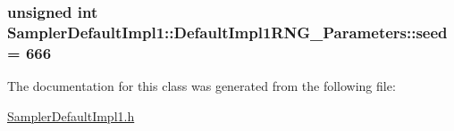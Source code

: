 \subsubsection[{\texorpdfstring{seed}{seed}}]{\setlength{\rightskip}{0pt plus 5cm}unsigned int Sampler\+Default\+Impl1\+::\+Default\+Impl1\+R\+N\+G\+\_\+\+Parameters\+::seed = 666}\hypertarget{class_sampler_default_impl1_1_1_default_impl1_r_n_g___parameters_a32cf0e83a0b27a5f2cef15e8fdfe003e}{}\label{class_sampler_default_impl1_1_1_default_impl1_r_n_g___parameters_a32cf0e83a0b27a5f2cef15e8fdfe003e}


The documentation for this class was generated from the following file\+:\begin{DoxyCompactItemize}
\item 
\hyperlink{_sampler_default_impl1_8h}{Sampler\+Default\+Impl1.\+h}\end{DoxyCompactItemize}
